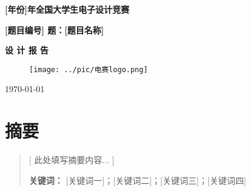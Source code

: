 \documentclass[UTF-8,zihao=-4]{ctexart}
\begin{document}
\begin{titlepage}
    \centering
    \vspace*{2cm}
    
    {\Huge \bfseries [年份]年全国大学生电子设计竞赛} %
    
    \vspace{2.5cm}
    
    {\huge \bfseries [题目编号] 题：[题目名称]} %
    
    \vspace{1.5cm}
    
    {\Large \bfseries 设 计 报 告}
    
    \vspace{2cm}

    \begin{figure}[H]
        \centering
        \texttt{[image: ../pic/电赛logo.png]}
    \end{figure}

    \vspace{6.5cm}

    
    {\large \today}
    
\end{titlepage}

\section*{摘要}
\begin{quote}
    \noindent
    [ 此处填写摘要内容... ]

    \vspace{1cm}
    \noindent
    \textbf{关键词：} [关键词一]；[关键词二]；[关键词三]；[关键词四] %
\end{quote}
\end{document}
